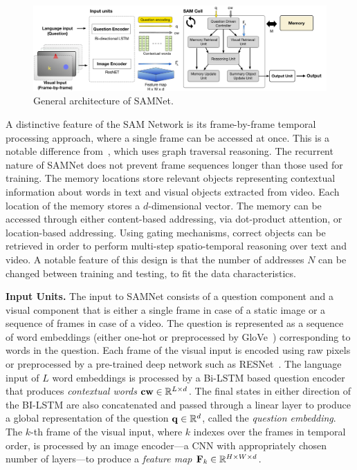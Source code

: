 \begin{figure}
	\centering
	\includegraphics[width=\textwidth]{../img/architecture/SAMNETmodel}
	\caption{General architecture of SAMNet.}
	\label{fig:samnet}\vspace{-10pt}
\end{figure}

A distinctive feature of the SAM Network is its frame-by-frame temporal processing approach, where a single frame can be accessed at once. This is a notable difference from~\cite{haurilet2019s}, which uses graph traversal reasoning. The recurrent nature of SAMNet does not prevent frame sequences longer than those used for training.
The memory locations store relevant objects representing contextual information about words in text and visual objects extracted from video.
Each location of the memory stores a $d$-dimensional vector. %
The memory can be accessed through either content-based addressing, via dot-product attention, or location-based addressing. Using gating mechanisms, correct objects can be retrieved in order to perform multi-step spatio-temporal reasoning over text and video.
A notable feature of this design is that the number of addresses $N$ can be changed between training and testing, to fit the data characteristics.


\smallskip

\noindent\textbf{Input Units.}
The input to SAMNet consists of a question component and a visual component that is either a single frame in case of a static image or a sequence of frames in case of a video.
The question is represented as a sequence of word embeddings (either one-hot or preprocessed by GloVe~\cite{pennington2014glove}) corresponding to words in the question.
Each frame of the visual input is encoded using raw pixels or preprocessed by a pre-trained deep network such as RESNet~\cite{he2016deep}.
The language input of $L$ word embeddings is processed by a Bi-LSTM based question encoder that produces \emph{contextual words} $\mathbf{cw} \in \mathbb{R}^{L \times d}$.
The final states in either direction of the BI-LSTM are also concatenated and passed through a linear layer to produce a global representation of the question
$\mathbf{q} \in \mathbb{R}^d$, called the \emph{question embedding}.
The $k$-th frame of the visual input, where $k$ indexes over the frames in temporal order, is processed by an image encoder---a CNN with appropriately chosen number of layers---to produce a \emph{feature map}
$\mathbf{F}_k \in \mathbb{R}^{H \times W \times d}$.

